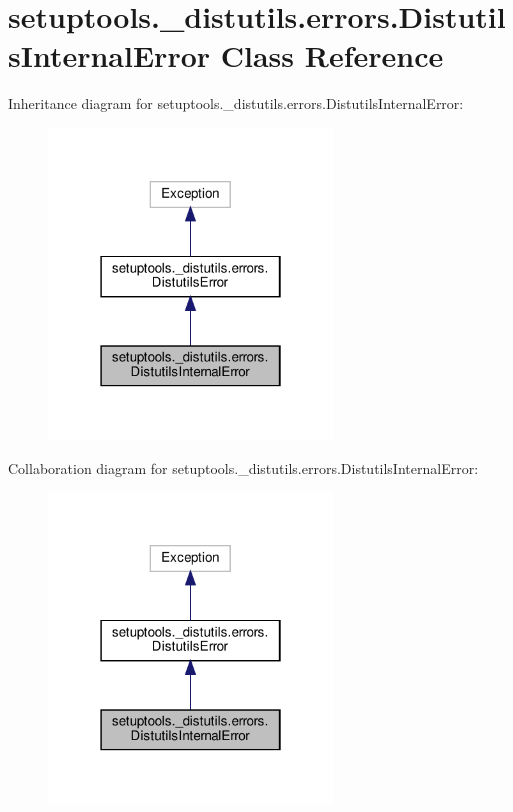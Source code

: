 \hypertarget{classsetuptools_1_1__distutils_1_1errors_1_1DistutilsInternalError}{}\section{setuptools.\+\_\+distutils.\+errors.\+Distutils\+Internal\+Error Class Reference}
\label{classsetuptools_1_1__distutils_1_1errors_1_1DistutilsInternalError}


Inheritance diagram for setuptools.\+\_\+distutils.\+errors.\+Distutils\+Internal\+Error\+:
\nopagebreak
\begin{figure}[H]
\begin{center}
\leavevmode
\includegraphics[width=214pt]{classsetuptools_1_1__distutils_1_1errors_1_1DistutilsInternalError__inherit__graph}
\end{center}
\end{figure}


Collaboration diagram for setuptools.\+\_\+distutils.\+errors.\+Distutils\+Internal\+Error\+:
\nopagebreak
\begin{figure}[H]
\begin{center}
\leavevmode
\includegraphics[width=214pt]{classsetuptools_1_1__distutils_1_1errors_1_1DistutilsInternalError__coll__graph}
\end{center}
\end{figure}


